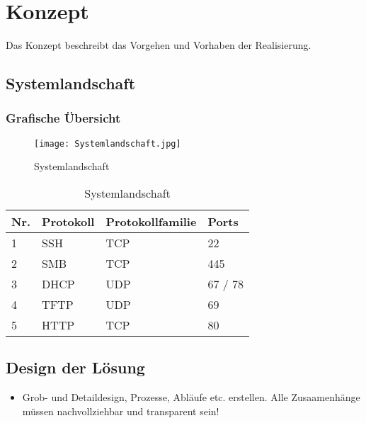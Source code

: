 \section{Konzept} 
\label{sec:Konzept}
Das Konzept beschreibt das Vorgehen und Vorhaben der Realisierung. 

\subsection{Systemlandschaft}
\subsubsection{Grafische Übersicht}
\begin{figure}[htb]
\centering
\texttt{[image: Systemlandschaft.jpg]}
\caption{Systemlandschaft}
\label{fig:Systemlandschaft}
\end{figure} 

\begin{table}[H]
\centering
\begin{tabular}{p{1cm}p{5cm}p{5cm}p{5cm}}
\hline
\rowcolor{heading} \textbf{Nr.} & \textbf{Protokoll} & \textbf{Protokollfamilie} & Ports \\\hline
1 & SSH & TCP & 22 \\\hline
2 & SMB & TCP & 445 \\\hline
3 & DHCP & UDP & 67 / 78 \\\hline
4 & TFTP & UDP & 69 \\\hline
5 & HTTP & TCP & 80 \\\hline
\end{tabular}
\caption{Systemlandschaft}
\end{table}


\subsection{Design der Lösung}
\begin{itemize}
	\item Grob- und Detaildesign, Prozesse, Abläufe etc. erstellen. Alle Zusaamenhänge müssen nachvollziehbar und transparent sein!
\end{itemize}

